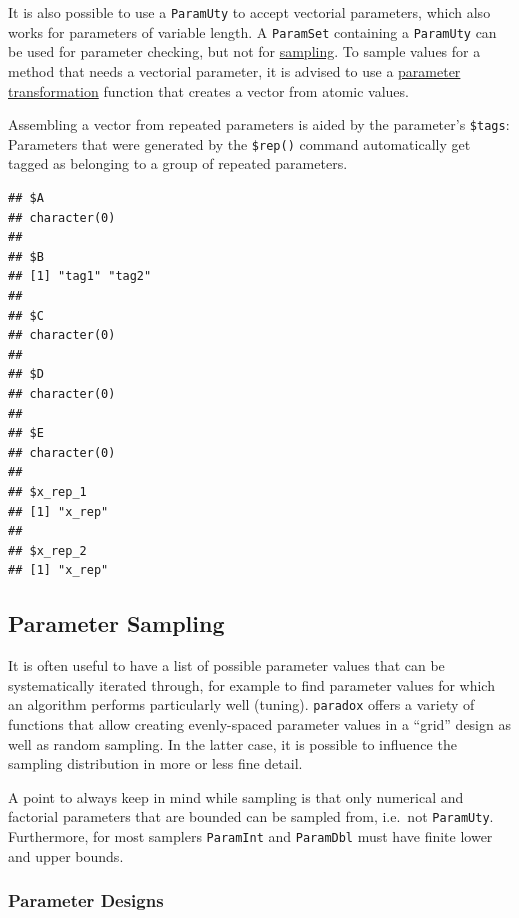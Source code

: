 \documentclass[]{scrbook}
\newenvironment{Shaded}{\begin{snugshade}}{\end{snugshade}}
\newcommand{\NormalTok}[1]{#1}
\newcommand{\OperatorTok}[1]{\textcolor[rgb]{0.81,0.36,0.00}{\textbf{#1}}}
\renewenvironment{Shaded} {\begin{snugshade}\small} {\end{snugshade}}
\begin{document}
It is also possible to use a \texttt{ParamUty} to accept vectorial parameters, which also works for parameters of variable length.
A \texttt{ParamSet} containing a \texttt{ParamUty} can be used for parameter checking, but not for \protect\hyperlink{parameter-sampling}{sampling}.
To sample values for a method that needs a vectorial parameter, it is advised to use a \protect\hyperlink{transformation-between-types}{parameter transformation} function that creates a vector from atomic values.

Assembling a vector from repeated parameters is aided by the parameter's \texttt{\$tags}: Parameters that were generated by the \texttt{\$rep()} command automatically get tagged as belonging to a group of repeated parameters.

\begin{Shaded}
\end{Shaded}

\begin{verbatim}
## $A
## character(0)
## 
## $B
## [1] "tag1" "tag2"
## 
## $C
## character(0)
## 
## $D
## character(0)
## 
## $E
## character(0)
## 
## $x_rep_1
## [1] "x_rep"
## 
## $x_rep_2
## [1] "x_rep"
\end{verbatim}

\hypertarget{parameter-sampling}{%
\subsection{Parameter Sampling}\label{parameter-sampling}}

It is often useful to have a list of possible parameter values that can be systematically iterated through, for example to find parameter values for which an algorithm performs particularly well (tuning).
\texttt{paradox} offers a variety of functions that allow creating evenly-spaced parameter values in a ``grid'' design as well as random sampling.
In the latter case, it is possible to influence the sampling distribution in more or less fine detail.

A point to always keep in mind while sampling is that only numerical and factorial parameters that are bounded can be sampled from, i.e.~not \texttt{ParamUty}.
Furthermore, for most samplers \texttt{ParamInt} and \texttt{ParamDbl} must have finite lower and upper bounds.

\hypertarget{parameter-designs}{%
\subsubsection{Parameter Designs}\label{parameter-designs}}
\end{document}
